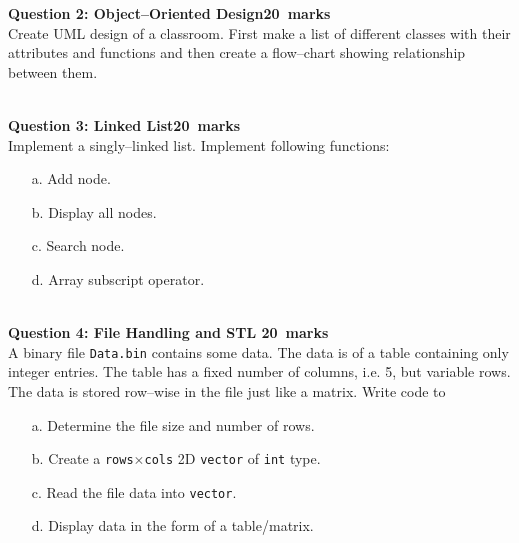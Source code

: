 \documentclass[12pt,a4paper]{article}
\def\Qtwo{20}
\def\Qthree{20}
\def\Qfour{20}
\newcommand\emptypage[1]
{
	\newpage
	\thispagestyle{empty}
	\mbox{}
}
\begin{document}
\newpage
\noindent\textbf{Question 2: Object--Oriented Design\hfill \Qtwo~marks}\\
Create UML design of a classroom. First make a list of different classes with their attributes and functions and then create a flow--chart showing relationship between them.
\emptypage

\emptypage\\

\noindent \textbf{Question 3: Linked List\hfill \Qthree~marks}\\
Implement a singly--linked list. Implement following functions:
\begin{itemize}
\item[a.] Add node.
\item[b.] Display all nodes.
\item[c.] Search node.
\item[d.] Array subscript operator.
\end{itemize}
\emptypage

\emptypage\\

\noindent\textbf{Question 4: File Handling and STL \hfill \Qfour~marks}\\
A binary file \verb|Data.bin| contains some data. The data is of a table containing only integer entries. The table has a fixed number of columns, i.e. 5, but variable rows. The data is stored row--wise in the file just like a matrix. Write code to
\begin{itemize}
\item[a.] Determine the file size and number of rows.
\item[b.] Create a \verb|rows|$\times$\verb|cols| 2D \verb|vector| of \verb|int| type.
\item[c.] Read the file data into \verb|vector|.
\item[d.] Display data in the form of a table/matrix.
\end{itemize} 
\emptypage

\emptypage\\
\end{document}
